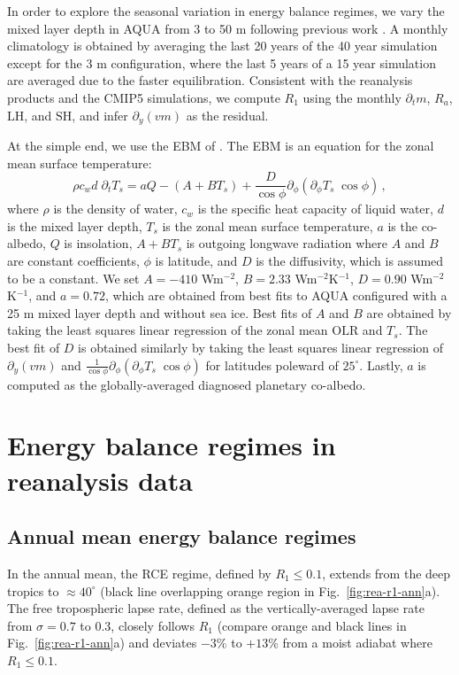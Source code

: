 \documentclass{ametsocV5}
\begin{document}
    In order to explore the seasonal variation in energy balance regimes, we vary the mixed layer depth in AQUA from 3 to 50 m following previous work \citep{donohoe2014, barpanda2020, shaw2020}. A monthly climatology is obtained by averaging the last 20 years of the 40 year simulation except for the 3 m configuration, where the last 5 years of a 15 year simulation are averaged due to the faster equilibration. Consistent with the reanalysis products and the CMIP5 simulations, we compute $R_1$ using the monthly $\partial_t m$, $R_a$, $\mathrm{LH}$, and $\mathrm{SH}$, and infer $\partial_y (vm) $ as the residual.

    At the simple end, we use the EBM of \cite{rose2017}. The EBM is an equation for the zonal mean surface temperature:
    \begin{equation}
      \rho c_w d \; \partial_t T_s = aQ - (A+BT_s)  + \frac{D}{\cos\phi}\partial_\phi\left( \partial_\phi T_s \; \cos\phi \right)\, ,
    \end{equation}
    where $\rho$ is the density of water, $c_w$ is the specific heat capacity of liquid water, $d$ is the mixed layer depth, $T_s$ is the zonal mean surface temperature, $a$ is the co-albedo, $Q$ is insolation, $A+BT_s$ is outgoing longwave radiation where $A$ and $B$ are constant coefficients, $\phi$ is latitude, and $D$ is the diffusivity, which is assumed to be a constant. We set $A=-410$ Wm$^{-2}$, $B=2.33$ Wm$^{-2}$K$^{-1}$, $D=0.90$ Wm$^{-2}$K$^{-1}$, and $a=0.72$, which are obtained from best fits to AQUA configured with a 25 m mixed layer depth and without sea ice. Best fits of $A$ and $B$ are obtained by taking the least squares linear regression of the zonal mean $\mathrm{OLR}$ and $T_s$. The best fit of $D$ is obtained similarly by taking the least squares linear regression of $\partial_y (vm)$ and $\frac{1}{\cos\phi}\partial_\phi \left(\partial_\phi T_s \; \cos\phi \right)$ for latitudes poleward of $25^\circ$. Lastly, $a$ is computed as the globally-averaged diagnosed planetary co-albedo.

\section{Energy balance regimes in reanalysis data} \label{sec:diagnostics}
    \subsection{Annual mean energy balance regimes}
    In the annual mean, the RCE regime, defined by $R_1 \le 0.1$, extends from the deep tropics to $\approx 40^\circ$ (black line overlapping orange region in Fig.~\ref{fig:rea-r1-ann}a). The free tropospheric lapse rate, defined as the vertically-averaged lapse rate from $\sigma=0.7$ to 0.3, closely follows $R_1$ (compare orange and black lines in Fig.~\ref{fig:rea-r1-ann}a) and deviates $-3$\% to $+13$\% from a moist adiabat where $R_1 \le 0.1$.
\end{document}
